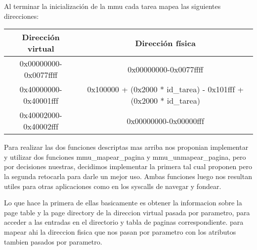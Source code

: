 \documentclass[10pt, a4paper]{article}
\begin{document}
Al terminar la inicializaci\'on de la mmu cada tarea mapea  las siguientes direcciones:

\begin{center}
\begin{tabular}{| c | c |}

	\hline
		Direcci\'on virtual & Direcci\'on f\'isica \\
	\hline
		0x00000000-0x0077ffff & 0x00000000-0x0077ffff  \\
		0x40000000-0x40001fff & 0x100000 + (0x2000 * id\_tarea) - 0x101fff + (0x2000 * id\_tarea) \\
		0x40002000-0x40002fff & 0x00000000-0x00000fff \\
	\hline

\end{tabular}
\end{center}

Para realizar las dos funciones descriptas mas arriba nos proponian implementar y utilizar dos funciones mmu\_mapear\_pagina y mmu\_unmapear\_pagina, pero por decisiones
 nuestras, decidimos implementar la primera tal cual proponen pero la segunda retocarla para darle un mejor uso. Ambas funciones luego nos resultan utiles para otras
  aplicaciones como en los syscalls de navegar y fondear.
 
 
Lo que hace la primera de ellas basicamente es obtener la informacion sobre la page table y la page directory de la direccion virtual pasada por parametro, para acceder
 a las entradas en el directorio y tabla de paginas correspondiente. para mapear ahi la direccion fisica que nos pasan por parametro con los atributos tambien pasados por
 parametro.
 
\end{document}
